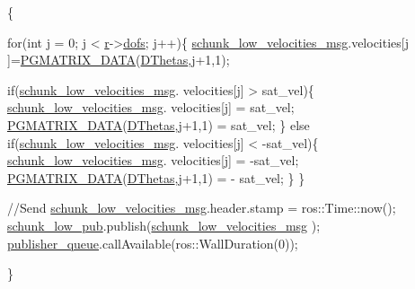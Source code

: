 \begin{DoxyCode}
                                                                   \{

        \textcolor{keywordflow}{for}(\textcolor{keywordtype}{int} j = 0; j < \hyperlink{classCartesian__controller_a5562129951bd802e4ded77fc716c87a0}{r}->\hyperlink{structRobot_a51d4a86ac5314a1ed8614d5664c80747}{dofs}; j++)\{
                \hyperlink{classCartesian__controller_af59178c57bdd73d9eb474577247bbe40}{schunk\_low\_velocities\_msg}.velocities[j
      ]=\hyperlink{gmatrix_8h_a7333180c47234295df2bd7b09ac00da8}{PGMATRIX\_DATA}(\hyperlink{classCartesian__controller_a5d6419e62e130150edfcbd82b1dadcae}{DThetas},j+1,1);

                \textcolor{keywordflow}{if}(\hyperlink{classCartesian__controller_af59178c57bdd73d9eb474577247bbe40}{schunk\_low\_velocities\_msg}.
      velocities[j] > sat\_vel)\{
                        \hyperlink{classCartesian__controller_af59178c57bdd73d9eb474577247bbe40}{schunk\_low\_velocities\_msg}.
      velocities[j] = sat\_vel;
                        \hyperlink{gmatrix_8h_a7333180c47234295df2bd7b09ac00da8}{PGMATRIX\_DATA}(\hyperlink{classCartesian__controller_a5d6419e62e130150edfcbd82b1dadcae}{DThetas},j+1,1) = 
      sat\_vel;
                \}
                \textcolor{keywordflow}{else} \textcolor{keywordflow}{if}(\hyperlink{classCartesian__controller_af59178c57bdd73d9eb474577247bbe40}{schunk\_low\_velocities\_msg}.
      velocities[j] < -sat\_vel)\{
                        \hyperlink{classCartesian__controller_af59178c57bdd73d9eb474577247bbe40}{schunk\_low\_velocities\_msg}.
      velocities[j] = -sat\_vel;
                        \hyperlink{gmatrix_8h_a7333180c47234295df2bd7b09ac00da8}{PGMATRIX\_DATA}(\hyperlink{classCartesian__controller_a5d6419e62e130150edfcbd82b1dadcae}{DThetas},j+1,1) = -
      sat\_vel;
                \}
        \}

        \textcolor{comment}{//Send}
        \hyperlink{classCartesian__controller_af59178c57bdd73d9eb474577247bbe40}{schunk\_low\_velocities\_msg}.header.stamp = 
      ros::Time::now();
        \hyperlink{classCartesian__controller_aa6ce9cffdd307127ed814d6e5132eba2}{schunk\_low\_pub}.publish(\hyperlink{classCartesian__controller_af59178c57bdd73d9eb474577247bbe40}{schunk\_low\_velocities\_msg}
      );
        \hyperlink{classCartesian__controller_a041a2eb6657c9b036a512fb21e9f5086}{publisher\_queue}.callAvailable(ros::WallDuration(0));

\}
\end{DoxyCode}


